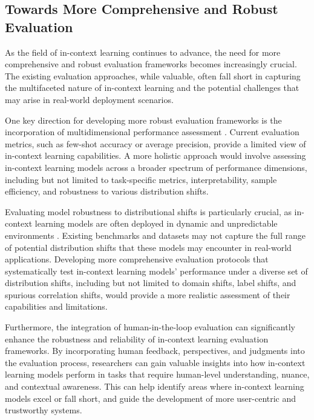 \documentclass[11pt]{article}
\begin{document}
\subsection{Towards More Comprehensive and Robust Evaluation}

As the field of in-context learning continues to advance, the need for more comprehensive and robust evaluation frameworks becomes increasingly crucial. The existing evaluation approaches, while valuable, often fall short in capturing the multifaceted nature of in-context learning and the potential challenges that may arise in real-world deployment scenarios.

One key direction for developing more robust evaluation frameworks is the incorporation of multidimensional performance assessment \cite{ref310,ref46}. Current evaluation metrics, such as few-shot accuracy or average precision, provide a limited view of in-context learning capabilities. A more holistic approach would involve assessing in-context learning models across a broader spectrum of performance dimensions, including but not limited to task-specific metrics, interpretability, sample efficiency, and robustness to various distribution shifts.

Evaluating model robustness to distributional shifts is particularly crucial, as in-context learning models are often deployed in dynamic and unpredictable environments \cite{ref311,ref312}. Existing benchmarks and datasets may not capture the full range of potential distribution shifts that these models may encounter in real-world applications. Developing more comprehensive evaluation protocols that systematically test in-context learning models' performance under a diverse set of distribution shifts, including but not limited to domain shifts, label shifts, and spurious correlation shifts, would provide a more realistic assessment of their capabilities and limitations.

Furthermore, the integration of human-in-the-loop evaluation \cite{ref313,ref314} can significantly enhance the robustness and reliability of in-context learning evaluation frameworks. By incorporating human feedback, perspectives, and judgments into the evaluation process, researchers can gain valuable insights into how in-context learning models perform in tasks that require human-level understanding, nuance, and contextual awareness. This can help identify areas where in-context learning models excel or fall short, and guide the development of more user-centric and trustworthy systems.
\end{document}
